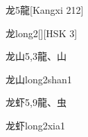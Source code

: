 \begin{entry}{龙}{5}{⿓}[Kangxi 212]
  \begin{phonetics}{龙}{long2}[][HSK 3]
  \end{phonetics}
\end{entry}

\begin{entry}{龙山}{5,3}{⿓、⼭}
  \begin{phonetics}{龙山}{long2shan1}
  \end{phonetics}
\end{entry}

\begin{entry}{龙虾}{5,9}{⿓、⾍}
  \begin{phonetics}{龙虾}{long2xia1}
  \end{phonetics}
\end{entry}


